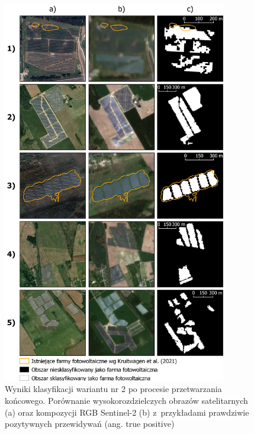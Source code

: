 \documentclass{amuthesis}
\begin{document}
\begin{figure}[t]

{\centering \includegraphics[width=0.87\textwidth,height=\textheight]{figures/pv_dataset2.png}

}

\caption{\label{fig-rycina-truepositive-dataset2}Wyniki klasyfikacji
wariantu nr 2 po procesie przetwarzania końcowego. Porównanie
wysokorozdzielczych obrazów satelitarnych (a) oraz kompozycji RGB
Sentinel-2 (b) z~przykładami prawdziwie pozytywnych przewidywań (ang.
true positive)}

\end{figure}
\end{document}
